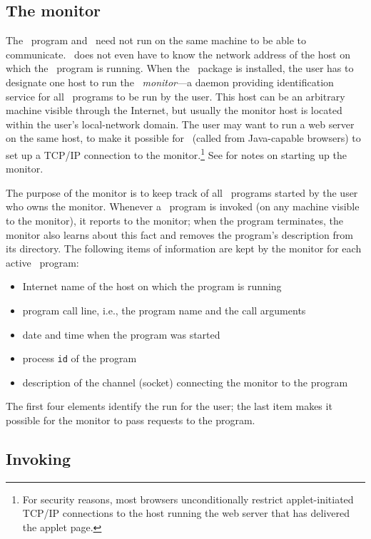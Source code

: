 \subsection{The monitor}
\label{rm_ds_mo}

The \smurph\ program and \dsd\ need not run on the same machine to be able
to communicate.
\dsd\ does not even have to know the network address of the host on which the
\smurph\ program is running.
When the \smurph\ package is installed, the user has to designate one
host to run the \smurph\ {\em monitor\/}---a daemon providing
identification service for all \smurph\ programs to be run by the user.
This host can be an arbitrary machine visible through the Internet, but
usually the monitor host is located within the user's local-network domain.
The user may want to run a web server on the same host, to make it possible
for \dsd\ (called from Java-capable browsers) to set up a TCP/IP
connection to the monitor.\footnote{For security reasons,
most browsers unconditionally restrict applet-initiated
TCP/IP connections to the host running the web server that has delivered
the applet page.}
See  for notes on starting up the monitor.

The purpose of the monitor is to keep track of all \smurph\ programs
started by the user who owns the monitor.
Whenever a \smurph\ program
is invoked (on any machine visible to the monitor),
it reports to the monitor;
when the program terminates, the monitor also learns about
this fact and removes the program's description from its directory.
The following items of information are kept by the monitor
for each active \smurph\ program:
\begin{itemize}
\item
Internet
name of the host on which the program is running
\item
program call line, i.e., the program name and the call arguments
\item
date and time when the program was started
\item
process {\tt id} of the program
\item
description of the channel (socket) connecting the monitor to the program
\end{itemize}

The first four elements identify the run for the user;
the last item makes it possible for the monitor to pass requests to
the program.

\subsection{Invoking \dsd}
\label{rm_ds_li}

